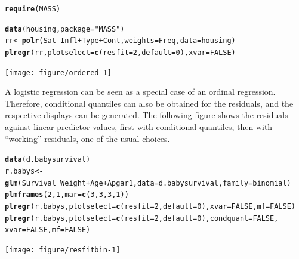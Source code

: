\documentclass[11pt]{article}\usepackage[]{graphicx}\usepackage[]{color}
\makeatletter
\newcommand{\hlnum}[1]{\textcolor[rgb]{0.686,0.059,0.569}{#1}}%
\newcommand{\hlstr}[1]{\textcolor[rgb]{0.192,0.494,0.8}{#1}}%
\newcommand{\hlopt}[1]{\textcolor[rgb]{0,0,0}{#1}}%
\newcommand{\hlstd}[1]{\textcolor[rgb]{0.345,0.345,0.345}{#1}}%
\newcommand{\hlkwb}[1]{\textcolor[rgb]{0.69,0.353,0.396}{#1}}%
\newcommand{\hlkwc}[1]{\textcolor[rgb]{0.333,0.667,0.333}{#1}}%
\newcommand{\hlkwd}[1]{\textcolor[rgb]{0.737,0.353,0.396}{\textbf{#1}}}%
\newenvironment{kframe}{%
 \def\at@end@of@kframe{}%
 \ifinner\ifhmode%
  \def\at@end@of@kframe{\end{minipage}}%
  \begin{minipage}{\columnwidth}%
 \fi\fi%
 \def\FrameCommand##1{\hskip\@totalleftmargin \hskip-\fboxsep
 \colorbox{shadecolor}{##1}\hskip-\fboxsep
     \hskip-\linewidth \hskip-\@totalleftmargin \hskip\columnwidth}%
 \MakeFramed {\advance\hsize-\width
   \@totalleftmargin\z@ \linewidth\hsize
   \@setminipage}}%
 {\par\unskip\endMakeFramed%
 \at@end@of@kframe}
\newenvironment{knitrout}{}{} %
\makeatother
\begin{document}
\begin{knitrout}
\color{fgcolor}\begin{kframe}
\begin{alltt}
\hlkwd{require}\hlstd{(MASS)}
\end{alltt}


{\ttfamily\noindent\itshape\color{messagecolor}{\#\# Loading required package: MASS}}\begin{alltt}
\hlkwd{data}\hlstd{(housing,} \hlkwc{package}\hlstd{=}\hlstr{"MASS"}\hlstd{)}
\hlstd{rr} \hlkwb{<-} \hlkwd{polr}\hlstd{(Sat} \hlopt{~} \hlstd{Infl} \hlopt{+} \hlstd{Type} \hlopt{+} \hlstd{Cont,} \hlkwc{weights} \hlstd{= Freq,} \hlkwc{data} \hlstd{= housing)}
\hlkwd{plregr}\hlstd{(rr,} \hlkwc{plotselect}\hlstd{=}\hlkwd{c}\hlstd{(}\hlkwc{resfit}\hlstd{=}\hlnum{2}\hlstd{,} \hlkwc{default}\hlstd{=}\hlnum{0}\hlstd{),} \hlkwc{xvar}\hlstd{=}\hlnum{FALSE}\hlstd{)}
\end{alltt}


{\ttfamily\noindent\itshape\color{messagecolor}{\#\# \\\#\# Re-fitting to get Hessian}}\end{kframe}
\texttt{[image: figure/ordered-1]} 
\end{knitrout}

A logistic regression can be seen as a special case of an ordinal regression.
Therefore, conditional quantiles can also be obtained for the residuals,
and the respective displays can be generated.
The following figure shows the residuals against linear predictor values,
first with conditional quantiles, then with ``working'' residuals,
one of the usual choices.

\begin{knitrout}
\color{fgcolor}\begin{kframe}
\begin{alltt}
  \hlkwd{data}\hlstd{(d.babysurvival)}
  \hlstd{r.babys} \hlkwb{<-} \hlkwd{glm}\hlstd{(Survival}\hlopt{~}\hlstd{Weight}\hlopt{+}\hlstd{Age}\hlopt{+}\hlstd{Apgar1,}\hlkwc{data}\hlstd{=d.babysurvival,}\hlkwc{family}\hlstd{=binomial)}
  \hlkwd{plmframes}\hlstd{(}\hlnum{2}\hlstd{,}\hlnum{1}\hlstd{,} \hlkwc{mar}\hlstd{=}\hlkwd{c}\hlstd{(}\hlnum{3}\hlstd{,}\hlnum{3}\hlstd{,}\hlnum{3}\hlstd{,}\hlnum{1}\hlstd{))}
  \hlkwd{plregr}\hlstd{(r.babys,} \hlkwc{plotselect}\hlstd{=}\hlkwd{c}\hlstd{(}\hlkwc{resfit}\hlstd{=}\hlnum{2}\hlstd{,} \hlkwc{default}\hlstd{=}\hlnum{0}\hlstd{),} \hlkwc{xvar}\hlstd{=}\hlnum{FALSE}\hlstd{,} \hlkwc{mf}\hlstd{=}\hlnum{FALSE}\hlstd{)}
  \hlkwd{plregr}\hlstd{(r.babys,} \hlkwc{plotselect}\hlstd{=}\hlkwd{c}\hlstd{(}\hlkwc{resfit}\hlstd{=}\hlnum{2}\hlstd{,} \hlkwc{default}\hlstd{=}\hlnum{0}\hlstd{),} \hlkwc{condquant}\hlstd{=}\hlnum{FALSE}\hlstd{,}
            \hlkwc{xvar}\hlstd{=}\hlnum{FALSE}\hlstd{,} \hlkwc{mf}\hlstd{=}\hlnum{FALSE}\hlstd{)}
\end{alltt}
\end{kframe}
\texttt{[image: figure/resfitbin-1]} 
\end{knitrout}
\end{document}
